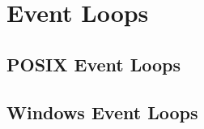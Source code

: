 \documentclass[11pt,a4paper]{mudbook}
\begin{document}
\chapter{Event Loops}

\section{POSIX Event Loops}

\section{Windows Event Loops}


\newpage
\printbibliography
\end{document}
